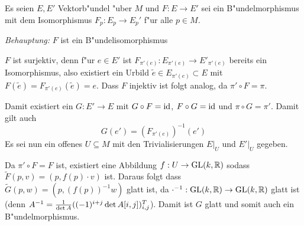 \begin{Loes}
Es seien $E, E'$ Vektorb"undel "uber $M$ und $F: E \to E'$ sei ein B"undelmorphismus mit dem Isomorphismus $F_p: E_p \to E_p'$ f"ur alle $p \in M$.

\emph{Behauptung:} $F$ ist ein B"undelisomorphismus

$F$ ist surjektiv, denn f"ur $e \in E'$ ist $F_{\pi'(e)}: E_{\pi'(e)} \to E'_{\pi'(e)}$ bereits ein Isomorphismus, also existiert ein Urbild $\tilde e \in E_{\pi'(e)} \subset E$ mit $F(\tilde e) = F_{\pi'(e)}(\tilde e) = e$. Dass $F$ injektiv ist folgt analog, da $\pi' \circ F = \pi$.

Damit existiert ein $G: E' \to E$ mit $G \circ F = \operatorname{id}$, $F \circ G = \operatorname{id}$ und $\pi \circ G = \pi'$. Damit gilt auch
	\[ G(e') = (F_{\pi'(e)})^{-1}(e') \]
Es sei nun ein offenes $U  \subseteq M$ mit den Trivialisierungen $E|_U$ und $E'|_U$ gegeben.
\begin{center}\end{center}
Da $\pi' \circ F = F$ ist, existiert eine Abbildung $f: U \to \operatorname{GL}(k, \operatorname{\mathbb{R}})$ sodass $\tilde F(p,v) = (p, f(p) \cdot v)$ ist. Daraus folgt dass $\tilde G(p,w) = (p, (f(p))^{-1}w)$ glatt ist, da $\cdot^{-1}: \operatorname{GL}(k,\operatorname{\mathbb{R}}) \to \operatorname{GL}(k, \operatorname{\mathbb{R}})$ glatt ist (denn $A^{-1} = \frac{1}{\operatorname{det} A}((-1)^{i+j} \operatorname{det} A[i,j])_{i,j}^T$). Damit ist $G$ glatt und somit auch ein B"undelmorphismus.
\end{Loes}

